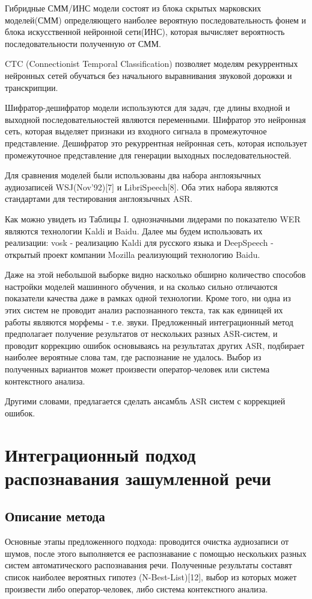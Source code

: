 \documentclass[conference]{IEEEtran}
\begin{document}
Гибридные СММ/ИНС модели состоят из блока скрытых марковских моделей(СММ) определяющего наиболее вероятную последовательность фонем
и блока искусственной нейронной сети(ИНС), которая вычисляет вероятность последовательности полученную от СММ.

CTC (Connectionist Temporal Classification) позволяет моделям рекуррентных нейронных сетей обучаться без начального выравнивания звуковой дорожки и транскрипции.

Шифратор-дешифратор модели используются для задач, где длины входной и выходной последовательностей являются переменными.
Шифратор это нейронная сеть, которая выделяет признаки из входного сигнала в промежуточное представление.
Дешифратор это рекуррентная нейронная сеть, которая использует  промежуточное представление для генерации выходных последовательностей.

Для сравнения моделей были использованы два набора англоязычных аудиозаписей WSJ(Nov’92)[7] и LibriSpeech[8].
Оба этих набора являются стандартами для тестирования англоязычных ASR.

Как можно увидеть из Таблицы I. однозначными лидерами по показателю WER являются технологии Kaldi и Baidu. Далее мы будем использовать их реализации: vosk - реализацию Kaldi для русского языка и DeepSpeech - открытый проект компании Mozilla реализующий технологию Baidu.

Даже на этой небольшой выборке видно насколько обширно количество способов настройки моделей машинного обучения, и на сколько сильно отличаются показатели качества даже в рамках одной технологии. Кроме того, ни одна из этих систем не проводит анализ распознанного текста, так как единицей их работы являются морфемы - т.е. звуки. Предложенный интеграционный метод предполагает получение результатов от нескольких разных ASR-систем, и проводит коррекцию ошибок основываясь на результатах других ASR, подбирает наиболее вероятные слова там, где распознание не удалось. Выбор из полученных вариантов может произвести оператор-человек или система контекстного анализа.

Другими словами, предлагается сделать ансамбль ASR систем с коррекцией ошибок.

\section{Интеграционный подход распознавания зашумленной речи}
\subsection{Описание метода}
Основные этапы предложенного подхода: проводится очистка аудиозаписи от шумов, после этого выполняется ее распознавание с помощью нескольких разных систем автоматического распознавания речи. Полученные результаты составят список наиболее вероятных гипотез (N-Best-List)[12], выбор из которых может произвести либо оператор-человек, либо система контекстного анализа.
\end{document}
